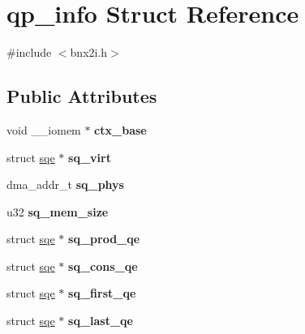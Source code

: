 \hypertarget{structqp__info}{
\section{qp\_\-info Struct Reference}
\label{structqp__info}
}


{\ttfamily \#include $<$bnx2i.h$>$}

\subsection*{Public Attributes}
\begin{DoxyCompactItemize}
\item 
\hypertarget{structqp__info_a7a507f9c809757696bf21549b4051486}{
void \_\-\_\-iomem $\ast$ {\bfseries ctx\_\-base}}
\label{structqp__info_a7a507f9c809757696bf21549b4051486}

\item 
\hypertarget{structqp__info_a2728ea52ea0f62f8c0f2caedd9acf567}{
struct \hyperlink{structsqe}{sqe} $\ast$ {\bfseries sq\_\-virt}}
\label{structqp__info_a2728ea52ea0f62f8c0f2caedd9acf567}

\item 
\hypertarget{structqp__info_ab7ca1af224d374451fe2b7849969dd45}{
dma\_\-addr\_\-t {\bfseries sq\_\-phys}}
\label{structqp__info_ab7ca1af224d374451fe2b7849969dd45}

\item 
\hypertarget{structqp__info_aee3231cb7d7d54cfd03f288e196e080e}{
u32 {\bfseries sq\_\-mem\_\-size}}
\label{structqp__info_aee3231cb7d7d54cfd03f288e196e080e}

\item 
\hypertarget{structqp__info_a06ccfd33f059027d8896df5e2be8425b}{
struct \hyperlink{structsqe}{sqe} $\ast$ {\bfseries sq\_\-prod\_\-qe}}
\label{structqp__info_a06ccfd33f059027d8896df5e2be8425b}

\item 
\hypertarget{structqp__info_ad4b6085bbcf4d575ba0a8b20785cc45b}{
struct \hyperlink{structsqe}{sqe} $\ast$ {\bfseries sq\_\-cons\_\-qe}}
\label{structqp__info_ad4b6085bbcf4d575ba0a8b20785cc45b}

\item 
\hypertarget{structqp__info_adf47cc8d279ba6c82ff58bacb08fbef7}{
struct \hyperlink{structsqe}{sqe} $\ast$ {\bfseries sq\_\-first\_\-qe}}
\label{structqp__info_adf47cc8d279ba6c82ff58bacb08fbef7}

\item 
\hypertarget{structqp__info_a7e190689c41b2aaea9c5a383144f94df}{
struct \hyperlink{structsqe}{sqe} $\ast$ {\bfseries sq\_\-last\_\-qe}}
\label{structqp__info_a7e190689c41b2aaea9c5a383144f94df}


\end{DoxyCompactItemize}
